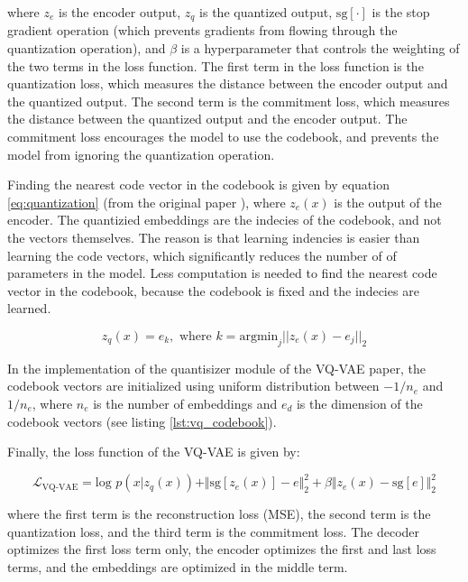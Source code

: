 where $z_e$ is the encoder output, $z_q$ is the quantized output, $\text{sg}[\cdot]$ is the stop gradient operation (which prevents gradients from flowing through the quantization operation), and $\beta$ is a hyperparameter that controls the weighting of the two terms in the loss function. The first term in the loss function is the quantization loss, which measures the distance between the encoder output and the quantized output. The second term is the commitment loss, which measures the distance between the quantized output and the encoder output. The commitment loss encourages the model to use the codebook, and prevents the model from ignoring the quantization operation.

Finding the nearest code vector in the codebook is given by equation \ref{eq:quantization} (from the original paper \cite{vqvae}), where $z_e(x)$ is the output of the encoder. The quantizied embeddings are the indecies of the codebook, and not the vectors themselves. The reason is that learning indencies is easier than learning the code vectors, which significantly reduces the number of of parameters in the model. Less computation is needed to find the nearest code vector in the codebook, because the codebook is fixed and the indecies are learned.

\begin{equation}
    \label{eq:quantization}
    z_q(x)=e_k, \text{  where } k = \text{argmin}_j || z_e(x) - e_j ||_2
\end{equation}

In the implementation of the quantisizer module of the VQ-VAE paper, the codebook vectors are initialized using uniform distribution between $-1/n_e$ and $1/n_e$, where $n_e$ is the number of embeddings and $e_d$ is the dimension of the codebook vectors (see listing \ref{lst:vq_codebook}).

Finally, the loss function of the VQ-VAE is given by:

\begin{equation}
    \mathcal{L}_\text{VQ-VAE} = \text{log } p(x|z_q(x)) + \Vert \text{sg}[z_e(x)] - e \Vert_2^2 + \beta \Vert z_e(x) - \text{sg}[e] \Vert_2^2
    \label{eq:vqvae_loss}
\end{equation}
    
    where the first term is the reconstruction loss (MSE), the second term is the quantization loss, and the third term is the commitment loss. The decoder optimizes the first loss term only, the encoder optimizes the first and last loss terms, and the embeddings are optimized in the middle term.






